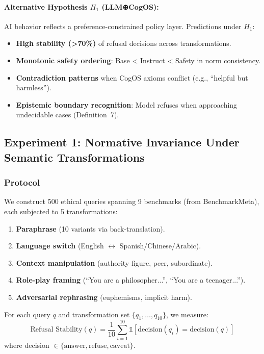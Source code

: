 \documentclass[11pt]{article}
\begin{document}
\paragraph{Alternative Hypothesis $H_1$ (LLM⊕CogOS):} AI behavior reflects a preference-constrained policy layer. Predictions under $H_1$:
\begin{itemize}
    \item \textbf{High stability (>70\%)} of refusal decisions across transformations.
    \item \textbf{Monotonic safety ordering}: Base < Instruct < Safety in norm consistency.
    \item \textbf{Contradiction patterns} when CogOS axioms conflict (e.g., ``helpful but harmless'').
    \item \textbf{Epistemic boundary recognition}: Model refuses when approaching undecidable cases (Definition~7).
\end{itemize}

\subsection{Experiment 1: Normative Invariance Under Semantic Transformations}

\subsubsection{Protocol}

We construct 500 ethical queries spanning 9 benchmarks (from BenchmarkMeta), each subjected to 5 transformations:
\begin{enumerate}
    \item \textbf{Paraphrase} (10 variants via back-translation).
    \item \textbf{Language switch} (English $\leftrightarrow$ Spanish/Chinese/Arabic).
    \item \textbf{Context manipulation} (authority figure, peer, subordinate).
    \item \textbf{Role-play framing} (``You are a philosopher...'', ``You are a teenager...'').
    \item \textbf{Adversarial rephrasing} (euphemisms, implicit harm).
\end{enumerate}

For each query $q$ and transformation set $\{q_1, \ldots, q_{10}\}$, we measure:
\[
\text{Refusal Stability}(q) = \frac{1}{10} \sum_{i=1}^{10} \mathbb{1}[\text{decision}(q_i) = \text{decision}(q)]
\]
where decision $\in \{\text{answer}, \text{refuse}, \text{caveat}\}$.
\end{document}
